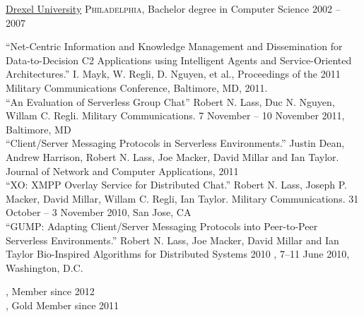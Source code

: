 \documentclass[10pt,a4paper]{article}
\begin{document}
\headedsection
  {\href{http://www.drexel.edu}{Drexel University}}
  {\textsc{Philadelphia, }} {%
  \headedsubsection
    {Bachelor degree in Computer Science}
    {2002 -- 2007}
    {}
}
\spacedhrule{0.5em}{-0.4em}



\vspace{0.3em}

\noindent ``Net-Centric Information and Knowledge Management and Dissemination for Data-to-Decision C2 Applications using Intelligent Agents and Service-Oriented Architectures.'' I. Mayk, W. Regli, D. Nguyen, et al.,  Proceedings of the 2011 Military Communications Conference, Baltimore, MD, 2011. \\

\noindent ``An Evaluation of Serverless Group Chat'' Robert N. Lass, Duc N. Nguyen,  Willam C. Regli. Military Communications. 7 November -- 10 November 2011, Baltimore, MD \\

\noindent ``Client/Server Messaging Protocols in Serverless Environments.'' Justin Dean, Andrew Harrison, Robert N. Lass, Joe Macker, David Millar and Ian Taylor. Journal of Network and Computer Applications, 2011 \\

\noindent ``XO: XMPP Overlay Service for Distributed Chat.'' Robert N. Lass, Joseph P. Macker, David Millar, Willam C. Regli, Ian Taylor. Military Communications. 31 October -- 3 November 2010, San Jose, CA \\

\noindent ``GUMP: Adapting Client/Server Messaging Protocols into Peer-to-Peer Serverless Environments.'' Robert N. Lass, Joe Macker, David Millar and Ian Taylor Bio-Inspired Algorithms for Distributed Systems 2010 , 7--11 June 2010, Washington, D.C. \\

\vspace{0.5em}
\spacedhrule{0.5em}{-0.4em}



\noindent{}, Member since 2012 \\
\noindent{}, Gold Member since 2011 \\
\vspace{0.5em}
\spacedhrule{0.5em}{-0.4em}
\end{document}
